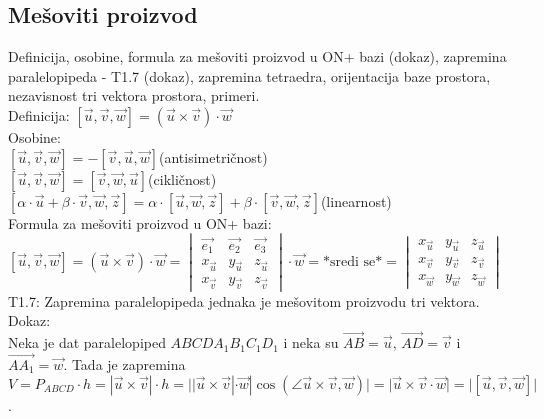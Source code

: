\documentclass[12pt]{article}
\newcommand{\vek}[1]{\overrightarrow{#1}}
\begin{document}
    \subsection{Mešoviti proizvod}
    Definicija, osobine, formula za mešoviti proizvod u ON+
    bazi (dokaz), zapremina paralelopipeda - T1.7 (dokaz),
    zapremina tetraedra, orijentacija baze prostora, nezavisnost
    tri vektora prostora, primeri.\\[1cm]
    Definicija: $[\vek{u},\vek{v},\vek{w}]=(\vek{u}\times\vek{v})\cdot\vek{w}$\\
    Osobine:\\
$[\vek{u},\vek{v},\vek{w}]=-[\vek{v},\vek{u},\vek{w}]$\hspace*{1cm}(antisimetričnost)\\
$[\vek{u},\vek{v},\vek{w}]=[\vek{v},\vek{w},\vek{u}]$\hspace*{1cm}(cikličnost)\\
$[\alpha\cdot\vek{u}+\beta\cdot\vek{v},\vek{w},\vek{z}]=\alpha\cdot[\vek{u},\vek{w},\vek{z}]+\beta\cdot[\vek{v},\vek{w},\vek{z}]$\hspace*{1cm}(linearnost)\\
    Formula za mešoviti proizvod u ON+ bazi:\\
$[\vek{u},\vek{v},\vek{w}]=(\vek{u}\times\vek{v})\cdot\vek{w}= \begin{vmatrix}
    \vek{e_1}   & \vek{e_2}   & \vek{e_3}   \\
    x_{\vek{u}} & y_{\vek{u}} & z_{\vek{u}} \\
    x_{\vek{v}} & y_{\vek{v}} & z_{\vek{v}}
\end{vmatrix}\cdot\vek{w}=\text{*sredi se*}= \begin{vmatrix}
    x_{\vek{u}} & y_{\vek{u}} & z_{\vek{u}} \\
    x_{\vek{v}} & y_{\vek{v}} & z_{\vek{v}} \\
    x_{\vek{w}} & y_{\vek{w}} & z_{\vek{w}}
\end{vmatrix}$\\[0.3cm]
    T1.7: Zapremina paralelopipeda jednaka je mešovitom proizvodu tri vektora.\\
    Dokaz:\\
    Neka je dat paralelopiped $ABCDA_1B_1C_1D_1$ i neka su $\vek{AB}=\vek{u}$, $\vek{AD}=\vek{v}$ i $\vek{AA_1}=\vek{w}$.
    Tada je zapremina $V=P_{ABCD}\cdot h=|\vek{u}\times\vek{v}|\cdot h=||\vek{u}\times\vek{v}|\cdot \vek{w}|\cos(\angle \vek{u}\times\vek{v},\vek{w})|=|\vek{u}\times\vek{v}\cdot \vek{w}|=|[\vek{u},\vek{v},\vek{w}]|$.\\
\end{document}
